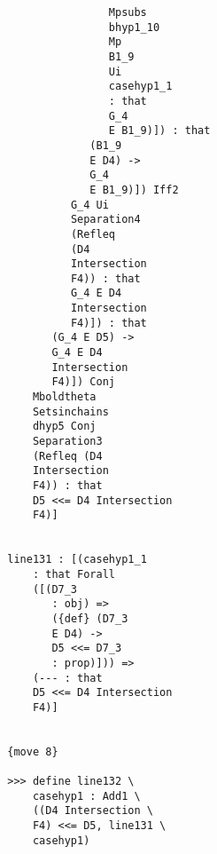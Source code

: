 \documentclass[12pt]{article}
\begin{document}
\begin{verbatim}
                                           Mpsubs 
                                           bhyp1_10 
                                           Mp 
                                           B1_9 
                                           Ui 
                                           casehyp1_1 
                                           : that 
                                           G_4 
                                           E B1_9)]) : that 
                                        (B1_9 
                                        E D4) -> 
                                        G_4 
                                        E B1_9)]) Iff2 
                                     G_4 Ui 
                                     Separation4 
                                     (Refleq 
                                     (D4 
                                     Intersection 
                                     F4)) : that 
                                     G_4 E D4 
                                     Intersection 
                                     F4)]) : that 
                                  (G_4 E D5) -> 
                                  G_4 E D4 
                                  Intersection 
                                  F4)]) Conj 
                               Mboldtheta 
                               Setsinchains 
                               dhyp5 Conj 
                               Separation3 
                               (Refleq (D4 
                               Intersection 
                               F4)) : that 
                               D5 <<= D4 Intersection 
                               F4)]


                           line131 : [(casehyp1_1 
                               : that Forall 
                               ([(D7_3 
                                  : obj) => 
                                  ({def} (D7_3 
                                  E D4) -> 
                                  D5 <<= D7_3 
                                  : prop)])) => 
                               (--- : that 
                               D5 <<= D4 Intersection 
                               F4)]


                           {move 8}

                           >>> define line132 \
                               casehyp1 : Add1 \
                               ((D4 Intersection \
                               F4) <<= D5, line131 \
                               casehyp1)



\end{verbatim}
\end{document}
